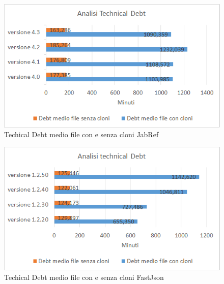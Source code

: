 \begin{figure}[h]
	\centering
	\includegraphics[scale=0.75, trim = 0cm 0cm 0cm 0cm, clip=true]{Grafici_jabRef/TechnicalDebt.png}
	\caption{Techical Debt medio file con e senza cloni JabRef}
	\label{fig:tdJabRef}
\end{figure}
\begin{figure}[h]
	\centering
	\includegraphics[scale=0.75, trim = 0cm 0cm 0cm 0cm, clip=true]{Grafici_fastJson/TechnicalDebt.png}
	\caption{Techical Debt medio file con e senza cloni FastJson}
	\label{fig:tdFastjson}
\end{figure}

